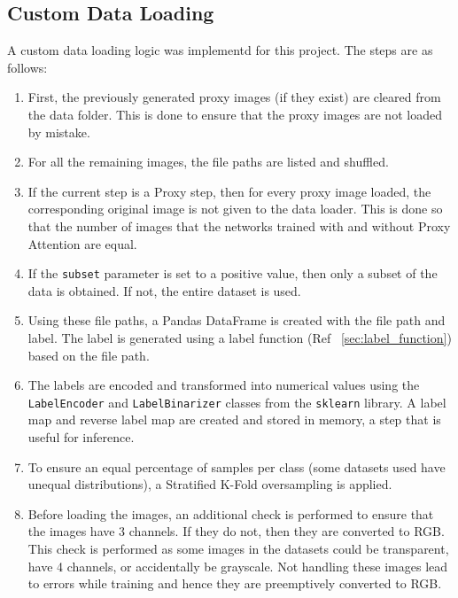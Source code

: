 \subsection{Custom Data Loading}
A custom data loading logic was implementd for this project. The steps are as follows:
\begin{enumerate}
    \item First, the previously generated proxy images (if they exist) are cleared from the data folder. This is done to ensure that the proxy images are not loaded by mistake.
    \item For all the remaining images, the file paths are listed and shuffled.
    \item If the current step is a Proxy step, then for every proxy image loaded, the corresponding original image is not given to the data loader. This is done so that the number of images that the networks trained with and without Proxy Attention are equal.
    \item If the \lstinline[language=Python]{subset} parameter is set to a positive value, then only a subset of the data is obtained. If not, the entire dataset is used.
    \item Using these file paths, a Pandas DataFrame is created with the file path and label. The label is generated using a label function (Ref ~\ref{sec:label_function}) based on the file path.
    \item The labels are encoded and transformed into numerical values using the \lstinline[language=Python]{LabelEncoder} and \lstinline[language=Python]{LabelBinarizer} classes from the \lstinline[language=Python]{sklearn} library. A label map and reverse label map are created and stored in memory, a step that is useful for inference.
    \item To ensure an equal percentage of samples per class (some datasets used have unequal distributions), a Stratified K-Fold oversampling is applied.
    \item Before loading the images, an additional check is performed to ensure that the images have 3 channels. If they do not, then they are converted to RGB. This check is performed as some images in the datasets could be transparent, have 4 channels, or accidentally be grayscale. Not handling these images lead to errors while training and hence they are preemptively converted to RGB.
\end{enumerate}

